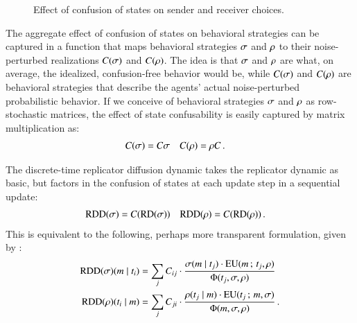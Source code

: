 \begin{figure}

  \caption{Effect of confusion of states on sender and receiver
    choices.}
  \label{fig:noise-perturbation-of-strategies}
\end{figure}

The aggregate effect of confusion of states on behavioral strategies
can be captured in a function that maps behavioral strategies
$\sigma$ and $\rho$ to their noise-perturbed realizations
$C(\sigma)$ and $C(\rho)$. The idea is that $\sigma$ and
$\rho$ are what, on average, the idealized, confusion-free behavior
would be, while $C(\sigma)$ and $C(\rho)$ are behavioral
strategies that describe the agents' actual noise-perturbed
probabilistic behavior. If we conceive of behavioral strategies
$\sigma$ and $\rho$ as row-stochastic matrices, the effect of
state confusability is easily captured by matrix multiplication as:
\begin{align}
  \label{eq:confusion-function}
  C(\sigma) & = C \sigma &    C(\rho) & = \rho C\,.
\end{align}

The discrete-time replicator diffusion dynamic takes the replicator
dynamic as basic, but factors in the confusion of states at each
update step in a sequential update:
\begin{align*}
  \mathrm{RDD}(\sigma) & = C(\mathrm{RD}(\sigma)) &   \mathrm{RDD}(\rho) & = C(\mathrm{RD}(\rho)) \,.
\end{align*}
This is equivalent to the following, perhaps more transparent
formulation, given by \citet{Correia2013:The-Bivalent-Tr}:
\begin{align*}
  \mathrm{RDD}(\sigma)(m \mid t_i) & = \sum_{j} C_{ij} \cdot
  \frac{\sigma(m \mid t_j) \cdot
    \mathrm{EU}(m \thinspace ; \thinspace t_j,\rho)}
  {\Phi(t_j,\sigma, \rho)} \\
    \mathrm{RDD}(\rho)(t_i \mid m) & = \sum_{j} C_{ji} \cdot
  \frac{\rho(t_j \mid m) \cdot
    \mathrm{EU}(t_j \thinspace ; \thinspace m,\sigma)} {\Phi(m,\sigma, \rho)}  \,.
\end{align*}

